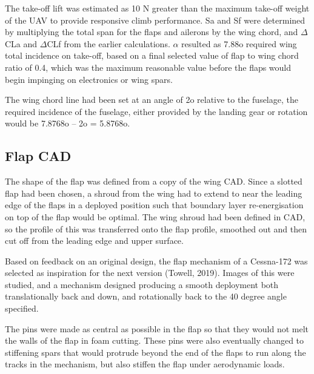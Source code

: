 \documentclass[../../main.tex]{subfiles}
\begin{document}

The take-off lift was estimated as 10 N greater than the maximum take-off weight of the UAV to provide responsive climb performance. Sa and Sf were determined by multiplying the total span for the flaps and ailerons by the wing chord, and $\Delta$CLa and $\Delta$CLf from the earlier calculations.
$\alpha$ resulted as 7.88o required wing total incidence on take-off, based on a final selected value of flap to wing chord ratio of 0.4, which was the maximum reasonable value before the flaps would begin impinging on electronics or wing spars.

The wing chord line had been set at an angle of 2o relative to the fuselage, the required incidence of the fuselage, either provided by the landing gear or rotation would be 7.8768o – 2o = 5.8768o. 

\subsection{Flap CAD} \label{sec:final-design-proposal:wing:flap-cad}

The shape of the flap was defined from a copy of the wing CAD.
Since a slotted flap had been chosen, a shroud from the wing had to extend to near the leading edge of the flaps in a deployed position such that boundary layer re-energisation on top of the flap would be optimal.
The wing shroud had been defined in CAD, so the profile of this was transferred onto the flap profile, smoothed out and then cut off from the leading edge and upper surface.  

Based on feedback on an original design, the flap mechanism of a Cessna-172 was selected as inspiration for the next version (Towell, 2019).
Images of this were studied, and a mechanism designed producing a smooth deployment both translationally back and down, and rotationally back to the 40 degree angle specified. 


The pins were made as central as possible in the flap so that they would not melt the walls of the flap in foam cutting.
These pins were also eventually changed to stiffening spars that would protrude beyond the end of the flaps to run along the tracks in the mechanism, but also stiffen the flap under aerodynamic loads.
\end{document}
